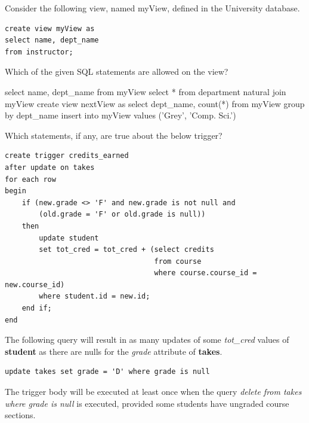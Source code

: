 \documentclass[12pt, addpoints, answers]{exam}
\begin{document}
\begin{questions}
\begin{minipage}{\linewidth}
\question[6]
Consider the following view, named myView, defined in the University database.\par\vspace{0.5em}
\begin{verbatim}
create view myView as
select name, dept_name
from instructor;
\end{verbatim}
Which of the given SQL statements are allowed on the view?\par\vspace{0.5em}
\begin{checkboxes}
    \CorrectChoice select name, dept\_name from myView
    \CorrectChoice select * from department natural join myView
    \CorrectChoice create view nextView as select dept\_name, count(*) from myView group by dept\_name
    \choice insert into myView values ('Grey', 'Comp. Sci.')
\end{checkboxes}
\end{minipage}\vspace{1em}

\begin{samepage}
\question[6]
Which statements, if any, are true about the below trigger?\par\vspace{0.5em}
\begin{verbatim}
create trigger credits_earned 
after update on takes
for each row
begin
    if (new.grade <> 'F' and new.grade is not null and 
        (old.grade = 'F' or old.grade is null)) 
    then
        update student
        set tot_cred = tot_cred + (select credits
                                   from course
                                   where course.course_id = new.course_id)
        where student.id = new.id;
    end if;
end
\end{verbatim}

\begin{checkboxes}
\CorrectChoice The following query will result in as many updates of some \textit{tot\_cred} values of \textbf{student} 
as there are nulls for the \textit{grade} attribute of \textbf{takes}.
\begin{verbatim}
update takes set grade = 'D' where grade is null
\end{verbatim}

\choice The trigger body will be executed at least once when the query \textit{delete from takes where grade is null} 
is executed, provided some students have ungraded course sections.


\end{checkboxes}
\end{samepage}
\end{questions}
\end{document}

